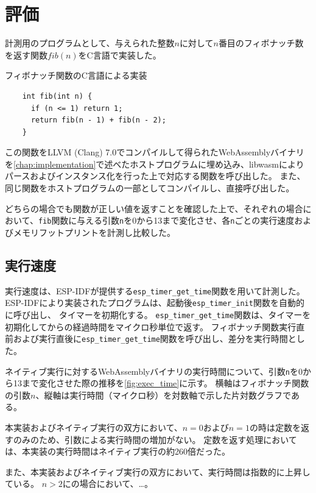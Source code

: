 \chapter{評価}
\label{chap:evaluation}

計測用のプログラムとして、与えられた整数$n$に対して$n$番目のフィボナッチ数を返す関数$fib(n)$をC言語で実装した。

\begin{itembox}[l]{フィボナッチ関数のC言語による実装}
  \begin{verbatim}
    int fib(int n) {
      if (n <= 1) return 1;
      return fib(n - 1) + fib(n - 2);
    }
  \end{verbatim}
\end{itembox}

この関数をLLVM (Clang) 7.0でコンパイルして得られたWebAssemblyバイナリを\ref{chap:implementation}で述べたホストプログラムに埋め込み、libwasmによりパースおよびインスタンス化を行った上で対応する関数を呼び出した。
また、同じ関数をホストプログラムの一部としてコンパイルし、直接呼び出した。

どちらの場合でも関数が正しい値を返すことを確認した上で、それぞれの場合において、\verb|fib|関数に与える引数\verb|n|を0から13まで変化させ、各\verb|n|ごとの実行速度およびメモリフットプリントを計測し比較した。

\section{実行速度}

実行速度は、ESP-IDFが提供する\verb|esp_timer_get_time|関数を用いて計測した。
ESP-IDFにより実装されたプログラムは、起動後\verb|esp_timer_init|関数を自動的に呼び出し、
タイマーを初期化する。
\verb|esp_timer_get_time|関数は、タイマーを初期化してからの経過時間をマイクロ秒単位で返す。
フィボナッチ関数実行直前および実行直後に\verb|esp_timer_get_time|関数を呼び出し、差分を実行時間とした。

ネイティブ実行に対するWebAssemblyバイナリの実行時間について、引数\verb|n|を0から13まで変化させた際の推移を\ref{fig:exec_time}に示す。
横軸はフィボナッチ関数の引数$n$、縦軸は実行時間（マイクロ秒）を対数軸で示した片対数グラフである。

本実装およびネイティブ実行の双方において、$n=0$および$n=1$の時は定数を返すのみのため、引数による実行時間の増加がない。
定数を返す処理においては、本実装の実行時間はネイティブ実行の約260倍だった。

また、本実装およびネイティブ実行の双方において、実行時間は指数的に上昇している。
$n>2$にの場合において、…。

